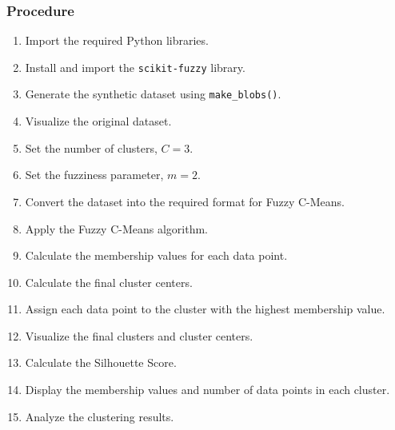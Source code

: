 \documentclass[a4paper,11pt]{article}
\begin{document}
\subsubsection{Procedure}
\begin{enumerate}
    \item Import the required Python libraries.
    \item Install and import the \texttt{scikit-fuzzy} library.
    \item Generate the synthetic dataset using \texttt{make\_blobs()}.
    \item Visualize the original dataset.
    \item Set the number of clusters, $C = 3$.
    \item Set the fuzziness parameter, $m = 2$.
    \item Convert the dataset into the required format for Fuzzy C-Means.
    \item Apply the Fuzzy C-Means algorithm.
    \item Calculate the membership values for each data point.
    \item Calculate the final cluster centers.
    \item Assign each data point to the cluster with the highest membership value.
    \item Visualize the final clusters and cluster centers.
    \item Calculate the Silhouette Score.
    \item Display the membership values and number of data points in each cluster.
    \item Analyze the clustering results.
\end{enumerate}
\end{document}
